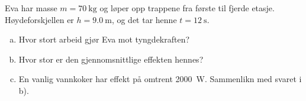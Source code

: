 %
Eva har masse $m = \SI{70}{\kilo\gram}$ og løper opp trappene fra første til fjerde etasje. Høydeforskjellen er $h = \SI{9.0}{\metre}$, og det tar henne $t = \SI{12}{\second}$.
\begin{enumerate}[a)]
    \item Hvor stort arbeid gjør Eva mot tyngdekraften?
    \item Hvor stor er den gjennomsnittlige effekten hennes?
    \item En vanlig vannkoker har effekt på omtrent \SI{2000}{\watt}. Sammenlikn med svaret i b).
\end{enumerate}
